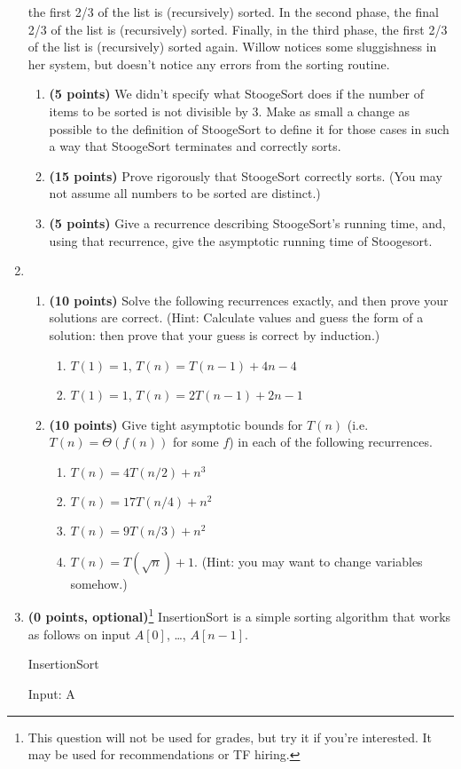\documentclass[11pt]{article}
\begin{document}
\begin{enumerate}
the first 2/3 of the list is (recursively) sorted. In the second phase, the final 2/3 of the list is (recursively) sorted.
Finally, in the third phase, the first 2/3 of the list is (recursively) sorted again.
Willow notices some sluggishness in her system, but doesn't notice any errors from the sorting routine. 
\begin{enumerate} 
\item 
{\bf (5 points)}
We didn't specify what StoogeSort does if the number of items to be sorted is not divisible by 3. 
Make as small a change as possible to the definition of StoogeSort to define it for those cases in such a way that StoogeSort terminates and correctly sorts.
\item
{\bf (15 points)}
Prove rigorously that StoogeSort correctly sorts. 
(You may not assume all numbers to be sorted are distinct.) 
\item
{\bf (5 points)}
Give a recurrence describing StoogeSort's running time, 
and, using that recurrence, give the asymptotic running time of Stoogesort.
\end{enumerate}
\item
\begin{enumerate}
\item
{\bf (10 points)}
Solve the following recurrences exactly, and then prove your solutions are correct. (Hint:
Calculate values and guess the form of a solution: then prove that your guess is correct by induction.)
\begin{enumerate}
\item
$T(1) = 1$, $T(n) = T(n-1) +4n-4$
\item
$T(1) = 1$, $T(n) = 2T(n-1) +2n-1$
\end{enumerate}
\item
{\bf (10 points)}
Give tight asymptotic bounds for $T(n)$ (i.e. $T(n) = \Theta(f(n))$ for some $f$) in each of the following recurrences. 
\begin{enumerate}
\item
$T(n) = 4T(n/2) +n^3$
\item
$T(n) = 17T(n/4) +n^2$
\item
$T(n) = 9T(n/3) +n^2$
\item
$T(n) = T(\sqrt{n}) +1$. (Hint: you may want to change variables somehow.)
\end{enumerate}
\end{enumerate}
\item
{\bf (0 points, optional)}\footnote{This question will not be used for grades, but try it if you're interested. 
It may be used for recommendations or TF hiring.}
InsertionSort is a simple sorting algorithm that works as follows on input $A[0]$, \ldots, $A[n-1]$.
\begin{algorithm}
\caption{InsertionSort}
\begin{algorithmic}
\STATE Input: A
	\ENDWHILE
\ENDFOR
\end{algorithmic}
\end{algorithm}


\end{enumerate}
\end{document}
